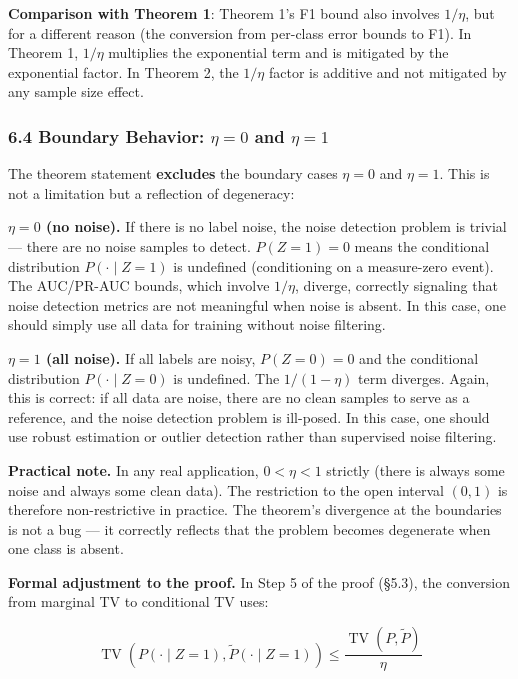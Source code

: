 \documentclass[
  12pt,
]{ctexart}
\begin{document}
\textbf{Comparison with Theorem 1}: Theorem 1's F1 bound also involves
\(1/\eta\), but for a different reason (the conversion from per-class
error bounds to F1). In Theorem 1, \(1/\eta\) multiplies the exponential
term and is mitigated by the exponential factor. In Theorem 2, the
\(1/\eta\) factor is additive and not mitigated by any sample size
effect.

\subsubsection{\texorpdfstring{6.4 Boundary Behavior: \(\eta = 0\) and
\(\eta = 1\)}{6.4 Boundary Behavior: \textbackslash eta = 0 and \textbackslash eta = 1}}\label{boundary-behavior-eta-0-and-eta-1}

The theorem statement \textbf{excludes} the boundary cases \(\eta = 0\)
and \(\eta = 1\). This is not a limitation but a reflection of
degeneracy:

\textbf{\(\eta = 0\) (no noise).} If there is no label noise, the noise
detection problem is trivial --- there are no noise samples to detect.
\(P(Z=1) = 0\) means the conditional distribution \(P(\cdot \mid Z=1)\)
is undefined (conditioning on a measure-zero event). The AUC/PR-AUC
bounds, which involve \(1/\eta\), diverge, correctly signaling that
noise detection metrics are not meaningful when noise is absent. In this
case, one should simply use all data for training without noise
filtering.

\textbf{\(\eta = 1\) (all noise).} If all labels are noisy,
\(P(Z=0) = 0\) and the conditional distribution \(P(\cdot \mid Z=0)\) is
undefined. The \(1/(1-\eta)\) term diverges. Again, this is correct: if
all data are noise, there are no clean samples to serve as a reference,
and the noise detection problem is ill-posed. In this case, one should
use robust estimation or outlier detection rather than supervised noise
filtering.

\textbf{Practical note.} In any real application, \(0 < \eta < 1\)
strictly (there is always some noise and always some clean data). The
restriction to the open interval \((0,1)\) is therefore non-restrictive
in practice. The theorem's divergence at the boundaries is not a bug ---
it correctly reflects that the problem becomes degenerate when one class
is absent.

\textbf{Formal adjustment to the proof.} In Step 5 of the proof (§5.3),
the conversion from marginal TV to conditional TV uses:

\[\operatorname{TV}(P(\cdot \mid Z=1), \tilde{P}(\cdot \mid Z=1)) \leq \frac{\operatorname{TV}(P, \tilde{P})}{\eta}\]
\end{document}
